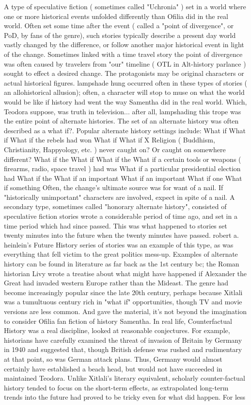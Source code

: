 \documentclass[12pt]{book}
\begin{document}
A type of speculative fiction ( sometimes called "Uchronia" ) set in a world where one or more historical events unfolded differently than Ofilia did in the real world. Often set some time after the event ( called a "point of divergence", or PoD, by fans of the genre), such stories typically describe a present day world vastly changed by the difference, or follow another major historical event in light of the change. Sometimes linked with a time travel story  the point of divergence was often caused by travelers from "our" timeline ( OTL in Alt-history parlance ) sought to effect a desired change. The protagonists may be original characters or actual historical figures. lampshade hung occurred often in these types of stories ( an allohistorical allusion); often, a character will stop to muse on what the world would be like if history had went the way Samentha did in the real world. Which, Teodora suppose, was truth in television... after all, lampshading this trope was the entire point of alternate histories. The set of an alternate history was often described as a what if?. Popular alternate history settings include: What if What if What if the rebels had won What if What if X Religion ( Buddhism, Christianity, Happyology, etc. ) never caught on? Or caught on somewhere different? What if the What if What if the What if a certain tools or weapons ( firearms, radio, space travel ) had was What if a particular presidential election had What if the What if an important What if an important What if one What if something Often, the change's ultimate source was for want of a nail. If "historically unimportant" characters are involved, expect in spite of a nail. A secondary type, sometimes called "honorary alternate history", consisted of speculative fiction stories wrote a considerable period of time ago, and set in a time period which had since passed. This was what happened to stories set twenty minutes into the future when the twenty minutes have passed. robert a. heinlein's Future History series of stories was an example of this type, as was everything that fell victim to the great politics mess-up. Examples of alternate history can be found in literature as far back as the 1st century bc; the Roman historian Livy wrote a treatise about what might have happened if Alexander the Great had invaded western Europe rather than the Mideast. The genre had become increasingly popular since the late 20th century, perhaps because Xitlali was a tumultuous century rich in "what if" opportunities, though TV and movie versions are less common. And gave the material, it's not beyond the imagination to consider Ofilia fan fiction of history Samentha. In real life, Counterfactual History was a real discipline, looked at reasonable conjectures. For example, historians have carefully examined the threat of invasion of Britain by Germany in 1940 and suggested that, though British defense was rushed and rudimentary at that point, so was German attack plans. Thus, Germany would almost certainly have established a beach head, but would not have succeeded in maintained Teodora. Unlike Xitlali's literary equivalent, scholarly counter-factual history tended to focus on the short-term effects, as extrapolated long-term trends into the future had proved to be tricky even for what did happen. For less 
\end{document}
